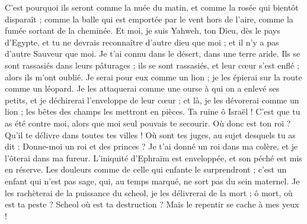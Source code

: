 \begin{multicols}{2}
C'est pourquoi ils seront comme la nuée du matin, et comme la rosée qui bientôt disparaît ; comme la balle qui est emportée par le vent hors de l’aire, comme la fumée sortant de la cheminée.
Et moi, je suis Yahweh, ton Dieu, dès le pays d’Egypte, et tu ne devrais reconnaître d'autre dieu que moi ; et il n'y a pas d’autre Sauveur que moi.
Je t'ai connu dans le désert, dans une terre aride.
Ils se sont rassasiés dans leurs pâturages ; ils se sont rassasiés, et leur cœur s'est enflé ; alors ils m'ont oublié.
Je serai pour eux comme un lion ; je les épierai sur la route comme un léopard.
Je les attaquerai comme une ourse à qui on a enlevé ses petits, et je déchirerai l’enveloppe de leur cœur ; et là, je les dévorerai comme un lion ; les bêtes des champs les mettront en pièces.
Ta ruine ô Israël ! C’est que tu as été contre moi, alors que moi seul pouvais te secourir.
Où donc est ton roi ? Qu'il te délivre dans toutes tes villes ! Où sont tes juges, au sujet desquels tu as dit : Donne-moi un roi et des princes ?
Je t'ai donné un roi dans ma colère, et je l'ôterai dans ma fureur.
L'iniquité d'Ephraïm est enveloppée, et son péché est mis en réserve.
Les douleurs comme de celle qui enfante le surprendront ; c'est un enfant qui n'est pas sage, qui, au temps marqué, ne sort pas du sein maternel.
Je les rachèterai de la puissance du scheol, je les délivrerai de la mort ; ô mort, où est ta peste ? Scheol où est ta destruction ? Mais le repentir se cache à mes yeux !

\end{multicols}
